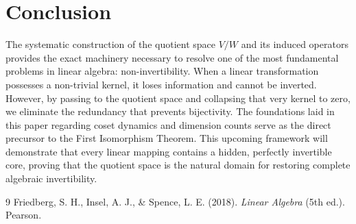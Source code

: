 \documentclass[12pt, a4paper]{article}
\theoremstyle{definition}
\theoremstyle{remark}
\begin{document}
	\section{Conclusion}
	The systematic construction of the quotient space $V/W$ and its induced operators provides the exact machinery necessary to resolve one of the most fundamental problems in linear algebra: non-invertibility. When a linear transformation possesses a non-trivial kernel, it loses information and cannot be inverted. However, by passing to the quotient space and collapsing that very kernel to zero, we eliminate the redundancy that prevents bijectivity. The foundations laid in this paper regarding coset dynamics and dimension counts serve as the direct precursor to the First Isomorphism Theorem. This upcoming framework will demonstrate that every linear mapping contains a hidden, perfectly invertible core, proving that the quotient space is the natural domain for restoring complete algebraic invertibility.
	
	\begin{thebibliography}{9}
		Friedberg, S. H., Insel, A. J., \& Spence, L. E. (2018). \textit{Linear Algebra} (5th ed.). Pearson.
	\end{thebibliography}
\end{document}
